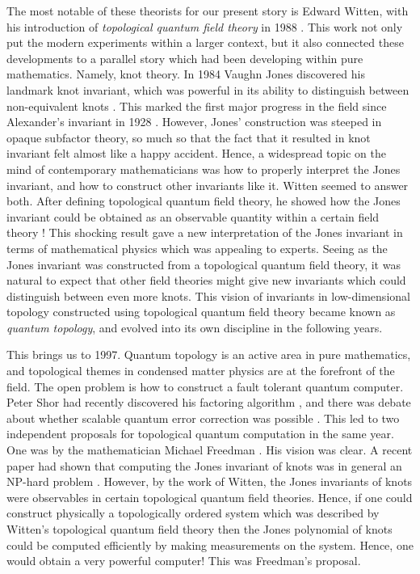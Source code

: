 \documentclass{article}
\theoremstyle{definition}
\newcommand{\0}{\left|0\right>}
\newcommand{\1}{\left|1\right>}
\numberwithin{figure}{section}
\begin{document}
The most notable of these theorists for our present story is Edward Witten, with his introduction of \textit{topological quantum field theory} in 1988 \cite{witten1988topological}. This work not only put the modern experiments within a larger context, but it also connected these developments to a parallel story which had been developing within pure mathematics. Namely, knot theory. In 1984 Vaughn Jones discovered his landmark knot invariant, which was powerful in its ability to distinguish between non-equivalent knots \cite{jones1997polynomial}. This marked the first major progress in the field since Alexander's invariant in 1928 \cite{alexander1928topological}. However, Jones’ construction was steeped in opaque subfactor theory, so much so that the fact that it resulted in knot invariant felt almost like a happy accident. Hence, a widespread topic on the mind of contemporary mathematicians was how to properly interpret the Jones invariant, and how to construct other invariants like it. Witten seemed to answer both. After defining topological quantum field theory, he showed how the Jones invariant could be obtained as an observable quantity within a certain field theory \cite{witten1989quantum}! This shocking result gave a new interpretation of the Jones invariant in terms of mathematical physics which was appealing to experts. Seeing as the Jones invariant was constructed from a topological quantum field theory, it was natural to expect that other field theories might give new invariants which could distinguish between even more knots. This vision of invariants in low-dimensional topology constructed using topological quantum field theory became known as \textit{quantum topology}, and evolved into its own discipline in the following years.

This brings us to 1997. Quantum topology is an active area in pure mathematics, and topological themes in condensed matter physics are at the forefront of the field. The open problem is how to construct a fault tolerant quantum computer. Peter Shor had recently discovered his factoring algorithm \cite{shor1994algorithms}, and there was debate about whether scalable quantum error correction was possible \cite{landauer1995quantum}. This led to two independent proposals for topological quantum computation in the same year. One was by the mathematician Michael Freedman \cite{freedman1998p}. His vision was clear. A recent paper had shown that computing the Jones invariant of knots was in general an NP-hard problem \cite{jaeger1990computational}. However, by the work of Witten, the Jones invariants of knots were observables in certain topological quantum field theories. Hence, if one could construct physically a topologically ordered system which was described by Witten’s topological quantum field theory then the Jones polynomial of knots could be computed efficiently by making measurements on the system. Hence, one would obtain a very powerful computer! This was Freedman’s proposal.
\end{document}
